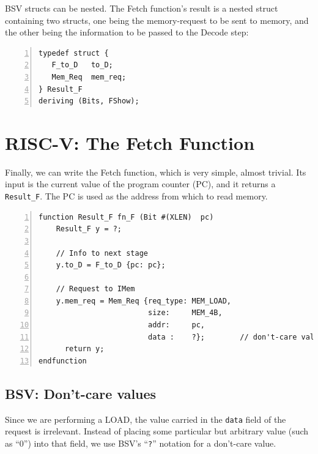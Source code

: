 
BSV structs can be nested.  The Fetch function's result is a nested
struct containing two structs, one being the memory-request to be sent
to memory, and the other being the information to be passed to the
Decode step:

\begin{Verbatim}[frame=single, numbers=left]
typedef struct {
   F_to_D   to_D;
   Mem_Req  mem_req;
} Result_F
deriving (Bits, FShow);
\end{Verbatim}


\section{RISC-V: The Fetch Function}

\label{Sec_Fetch_function}

Finally, we can write the Fetch function, which is very simple, almost
trivial.  Its input is the current value of the program counter (PC),
and it returns a \verb|Result_F|.  The PC is used as the address from
which to read memory.

\begin{Verbatim}[frame=single, numbers=left]
function Result_F fn_F (Bit #(XLEN)  pc)
    Result_F y = ?;

    // Info to next stage
    y.to_D = F_to_D {pc: pc};

    // Request to IMem
    y.mem_req = Mem_Req {req_type: MEM_LOAD,
                         size:     MEM_4B,
                         addr:     pc,
                         data :    ?};        // don't-care value
      return y;
endfunction
\end{Verbatim}


\subsection{BSV: Don't-care values} 


Since we are performing a LOAD, the value carried in the \verb|data|
field of the request is irrelevant.  Instead of placing some
particular but arbitrary value (such as ``0'') into that field, we use
BSV's ``\verb|?|'' notation for a don't-care value.

